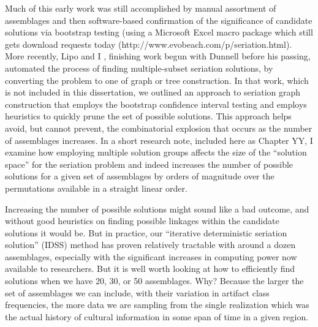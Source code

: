 Much of this early work was still accomplished by manual assortment of assemblages and then software-based confirmation of the significance of candidate solutions via bootstrap testing (using a Microsoft Excel macro package which still gets download requests today (http://www.evobeach.com/p/seriation.html). More recently, Lipo and I \citeyearpar{Lipo2015}, finishing work begun with Dunnell before his passing, automated the process of finding multiple-subset seriation solutions, by converting the problem to one of graph or tree construction. In that work, which is not included in this dissertation, we outlined an approach to seriation graph construction that employs the bootstrap confidence interval testing and employs heuristics to quickly prune the set of possible solutions. This approach helps avoid, but cannot prevent, the combinatorial explosion that occurs as the number of assemblages increases. In a short research note, included here as Chapter YY, I examine how employing multiple solution groups affects the size of the “solution space” for the seriation problem and indeed increases the number of possible solutions for a given set of assemblages by orders of magnitude over the permutations available in a straight linear order.

Increasing the number of possible solutions might sound like a bad outcome, and without good heuristics on finding possible linkages within the candidate solutions it would be. But in practice, our “iterative deterministic seriation solution” (IDSS) method has proven relatively tractable with around a dozen assemblages, especially with the significant increases in computing power now available to researchers. But it is well worth looking at how to efficiently find solutions when we have 20, 30, or 50 assemblages. Why? Because the larger the set of assemblages we can include, with their variation in artifact class frequencies, the more data we are sampling from the single realization which was the actual history of cultural information in some span of time in a given region.

